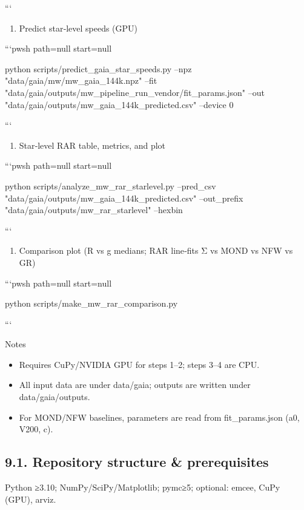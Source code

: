 \documentclass[11pt,a4paper]{article}
\begin{document}
```


\begin{enumerate}
\item Predict star‑level speeds (GPU)
\end{enumerate}

```pwsh path=null start=null

python scripts/predict\_gaia\_star\_speeds.py --npz "data/gaia/mw/mw\_gaia\_144k.npz" --fit "data/gaia/outputs/mw\_pipeline\_run\_vendor/fit\_params.json" --out "data/gaia/outputs/mw\_gaia\_144k\_predicted.csv" --device 0

```


\begin{enumerate}
\item Star‑level RAR table, metrics, and plot
\end{enumerate}

```pwsh path=null start=null

python scripts/analyze\_mw\_rar\_starlevel.py --pred\_csv "data/gaia/outputs/mw\_gaia\_144k\_predicted.csv" --out\_prefix "data/gaia/outputs/mw\_rar\_starlevel" --hexbin

```


\begin{enumerate}
\item Comparison plot (R vs g medians; RAR line‑fits Σ vs MOND vs NFW vs GR)
\end{enumerate}

```pwsh path=null start=null

python scripts/make\_mw\_rar\_comparison.py

```


Notes

\begin{itemize}
\item Requires CuPy/NVIDIA GPU for steps 1–2; steps 3–4 are CPU.
\item All input data are under data/gaia; outputs are written under data/gaia/outputs.
\item For MOND/NFW baselines, parameters are read from fit\_params.json (a0, V200, c).
\end{itemize}


\subsection{9.1. Repository structure \& prerequisites}


Python ≥3.10; NumPy/SciPy/Matplotlib; pymc≥5; optional: emcee, CuPy (GPU), arviz.
\end{document}
